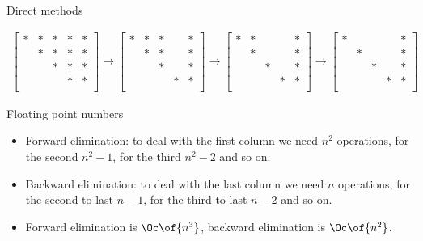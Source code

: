 \documentclass[11pt,xcolor={dvipsnames},aspectratio=159,hyperref={pdftex,pdfpagemode=UseNone,hidelinks,pdfdisplaydoctitle=true},usepdftitle=false]{beamer}
\begin{document}
\begin{frame}{Direct methods}
\begin{itemize}
\begin{itemize}
\begin{align*}
            \left[\begin{array}{cccc|c}
                * & * & * & * & * \\
                 & * & * & * & * \\
                 &  & * & * & * \\
                 &  &   & * & * \\
            \end{array}\right] 
                    \rightarrow
            \left[\begin{array}{cccc|c}
                * & * & * &  & * \\
                 & * & * &  & * \\
                 &  & * &  & * \\
                 &  &   & * & * \\
            \end{array}\right] 
                    \rightarrow
                    \left[\begin{array}{cccc|c}
                        * & * &  &  & * \\
                         & * &  &  & * \\
                         &  & * &  & * \\
                         &  &   & * & * \\
                    \end{array}\right] 
                    \rightarrow
                    \left[\begin{array}{cccc|c}
                        * &  &  &  & * \\
                         & * &  &  & * \\
                         &  & * &  & * \\
                         &  &   & * & * \\
                    \end{array}\right] 
            \end{align*}
        \end{itemize}
    \end{itemize}
    \end{frame}
    

\begin{frame}{Floating point numbers}

    \begin{itemize}  
    \item Forward elimination: to deal with the first column we need $n^2$ operations, for the second $n^2 - 1$, for the third $n^2 - 2$ and so on.
    \item Backward elimination: to deal with the last column we need $n$ operations, for the second to last $n-1$, for the third to last $n-2$ and so on.
    \item Forward elimination is $\Oc\of{n^3}$, backward elimination is $\Oc\of{n^2}$.
    \end{itemize}
    \end{frame}
\end{document}
